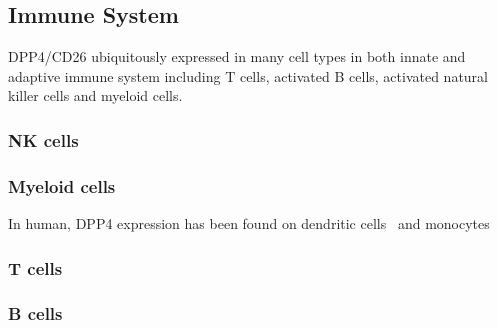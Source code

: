 \subsection{Immune System}
DPP4/CD26 ubiquitously expressed in many cell types in both innate and adaptive immune system including T cells, activated B cells, activated natural killer cells and myeloid cells.~\cite{Abbott1994,Shingu2003,Hong1989,Gutschmidt1981,Dikov2004,Bühling1995,Tanaka1992,Gorrell1991}  

\subsubsection{NK cells}

\subsubsection{Myeloid cells}
In human, DPP4 expression has been found on dendritic cells~\cite{Zhong2013,Gliddon2002,Epardaud2004} and monocytes 

\subsubsection{T cells}
\subsubsection{B cells}
